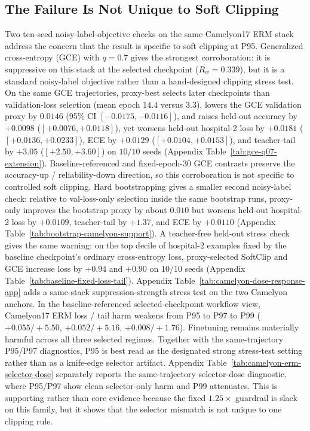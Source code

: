 \subsection{The Failure Is Not Unique to Soft Clipping}
Two ten-seed noisy-label-objective checks on the same Camelyon17 ERM stack address the concern that the result is specific to soft clipping at P95.
Generalized cross-entropy (GCE) with $q=0.7$ gives the strongest corroboration: it is suppressive on this stack at the selected checkpoint ($R_w=0.339$), but it is a standard noisy-label objective rather than a hand-designed clipping stress test.
On the same GCE trajectories, proxy-best selects later checkpoints than validation-loss selection (mean epoch $14.4$ versus $3.3$), lowers the GCE validation proxy by $0.0146$ (95\% CI $[-0.0175,-0.0116]$), and raises held-out accuracy by $+0.0098$ ($[+0.0076,+0.0118]$), yet worsens held-out hospital-2 loss by $+0.0181$ ($[+0.0136,+0.0233]$), ECE by $+0.0129$ ($[+0.0104,+0.0153]$), and teacher-tail by $+3.05$ ($[+2.50,+3.60]$) on $10/10$ seeds (Appendix Table~\ref{tab:gce-q07-extension}).
Baseline-referenced and fixed-epoch-30 GCE contrasts preserve the accuracy-up / reliability-down direction, so this corroboration is not specific to controlled soft clipping.
Hard bootstrapping gives a smaller second noisy-label check: relative to val-loss-only selection inside the same bootstrap runs, proxy-only improves the bootstrap proxy by about $0.010$ but worsens held-out hospital-2 loss by $+0.0109$, teacher-tail by $+1.37$, and ECE by $+0.0110$ (Appendix Table~\ref{tab:bootstrap-camelyon-support}).
A teacher-free held-out stress check gives the same warning: on the top decile of hospital-2 examples fixed by the baseline checkpoint's ordinary cross-entropy loss, proxy-selected SoftClip and GCE increase loss by $+0.94$ and $+0.90$ on $10/10$ seeds (Appendix Table~\ref{tab:baseline-fixed-loss-tail}).
Appendix Table~\ref{tab:camelyon-dose-response-app} adds a same-stack suppression-strength stress test on the two Camelyon anchors.
In the baseline-referenced selected-checkpoint workflow view, Camelyon17 ERM loss / tail harm weakens from P95 to P97 to P99 ($+0.055/+5.50$, $+0.052/+5.16$, $+0.008/+1.76$).
Finetuning remains materially harmful across all three selected regimes.
Together with the same-trajectory P95/P97 diagnostics, P95 is best read as the designated strong stress-test setting rather than as a knife-edge selector artifact.
Appendix Table~\ref{tab:camelyon-erm-selector-dose} separately reports the same-trajectory selector-dose diagnostic, where P95/P97 show clean selector-only harm and P99 attenuates.
This is supporting rather than core evidence because the fixed $1.25\times$ guardrail is slack on this family, but it shows that the selector mismatch is not unique to one clipping rule.

